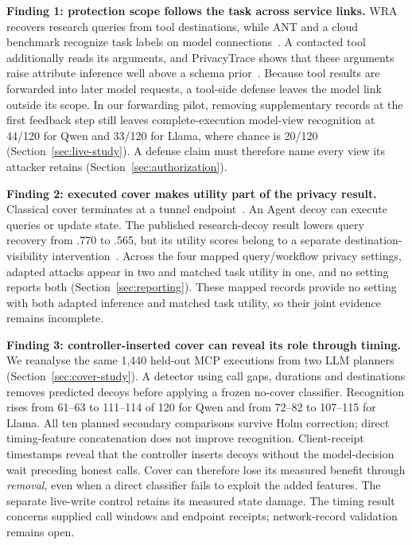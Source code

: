 \textbf{Finding 1: protection scope follows the task across service links.} WRA recovers research queries from tool destinations, while ANT and a cloud benchmark recognize task labels on model connections~\cite{jeong2026wra,li2026ant,pouryousef2026traffic}. A contacted tool additionally reads its arguments, and PrivacyTrace shows that these arguments raise attribute inference well above a schema prior~\cite{duan2026privacytrace}. Because tool results are forwarded into later model requests, a tool-side defense leaves the model link outside its scope. In our forwarding pilot, removing supplementary records at the first feedback step still leaves complete-execution model-view recognition at 44/120 for Qwen and 33/120 for Llama, where chance is 20/120 (Section~\ref{sec:live-study}). A defense claim must therefore name every view its attacker retains (Section~\ref{sec:authorization}).

\textbf{Finding 2: executed cover makes utility part of the privacy result.} Classical cover terminates at a tunnel endpoint~\cite{apthorpe2019stp}. An Agent decoy can execute queries or update state. The published research-decoy result lowers query recovery from .770 to .565, but its utility scores belong to a separate destination-visibility intervention~\cite{jeong2026wra}. Across the four mapped query/workflow privacy settings, adapted attacks appear in two and matched task utility in one, and no setting reports both (Section~\ref{sec:reporting}). These mapped records provide no setting with both adapted inference and matched task utility, so their joint evidence remains incomplete.

\textbf{Finding 3: controller-inserted cover can reveal its role through timing.} We reanalyse the same 1,440 held-out MCP executions from two LLM planners (Section~\ref{sec:cover-study}). A detector using call gaps, durations and destinations removes predicted decoys before applying a frozen no-cover classifier. Recognition rises from 61--63 to 111--114 of 120 for Qwen and from 72--82 to 107--115 for Llama. All ten planned secondary comparisons survive Holm correction; direct timing-feature concatenation does not improve recognition. Client-receipt timestamps reveal that the controller inserts decoys without the model-decision wait preceding honest calls. Cover can therefore lose its measured benefit through \emph{removal}, even when a direct classifier fails to exploit the added features. The separate live-write control retains its measured state damage. The timing result concerns supplied call windows and endpoint receipts; network-record validation remains open.

